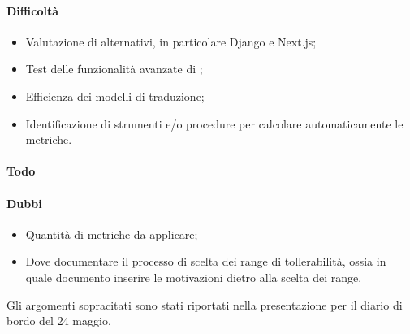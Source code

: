 \paragraph{Difficoltà}
\begin{itemize}
	\item Valutazione di  alternativi, in particolare Django e Next.js;
	\item Test delle funzionalità avanzate di ;
	\item Efficienza dei modelli di traduzione;
	\item Identificazione di strumenti e/o procedure per calcolare automaticamente le metriche.
\end{itemize}	
\paragraph{Todo}
\paragraph{Dubbi}
\begin{itemize}
	\item Quantità di metriche da applicare;
	\item Dove documentare il processo di scelta dei range di tollerabilità, ossia in quale documento inserire le motivazioni dietro alla scelta dei range.
\end{itemize}

\vspace{0.5\baselineskip}
\par Gli argomenti sopracitati sono stati riportati nella presentazione per il diario di bordo del 24 maggio.
